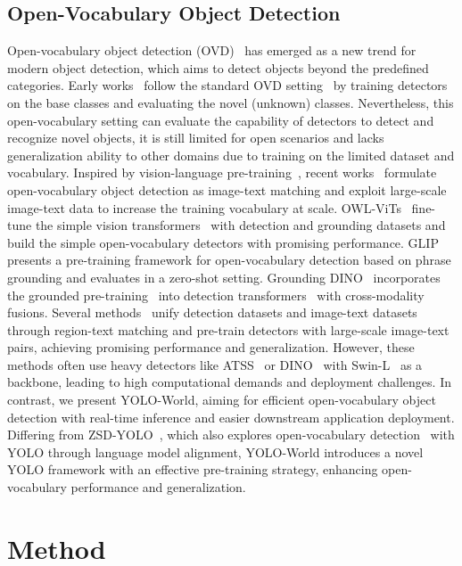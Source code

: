 \documentclass[10pt,twocolumn,letterpaper]{article}
\newcommand{\name}{YOLO-World}
\begin{document}
\subsection{Open-Vocabulary Object Detection}
Open-vocabulary object detection (OVD)~\cite{OVD} has emerged as a new trend for modern object detection, which aims to detect objects beyond the predefined categories. Early works~\cite{ViLD} follow the standard OVD setting~\cite{OVD} by training detectors on the base classes and evaluating the novel (unknown) classes. Nevertheless, this open-vocabulary setting can evaluate the capability of detectors to detect and recognize novel objects, it is still limited for open scenarios and lacks generalization ability to other domains due to training on the limited dataset and vocabulary. Inspired by vision-language pre-training~\cite{CLIP,ALIGN}, recent works~\cite{RegionCLIP,Detic,FVLM,DetPro,BARON} formulate open-vocabulary object detection as image-text matching and exploit large-scale image-text data to increase the training vocabulary at scale.
OWL-ViTs~\cite{owlv1,owlv2} fine-tune the simple vision transformers~\cite{ViT} with detection and grounding datasets and build the simple open-vocabulary detectors with promising performance.
GLIP~\cite{GLIP} presents a pre-training framework for open-vocabulary detection based on phrase grounding and evaluates in a zero-shot setting. Grounding DINO~\cite{GroundingDINO} incorporates the grounded pre-training~\cite{GLIP} into detection transformers~\cite{DINO} with cross-modality fusions.
Several methods~\cite{GLIPv2,VLDet,DetCLIP,DetCLIPv2} unify detection datasets and image-text datasets through region-text matching and pre-train detectors with large-scale image-text pairs, achieving promising performance and generalization. However, these methods often use heavy detectors like ATSS~\cite{ATSS} or DINO~\cite{DINO} with Swin-L~\cite{SwinTransformer} as a backbone, leading to high computational demands and deployment challenges. In contrast, we present \name{}, aiming for efficient open-vocabulary object detection with real-time inference and easier downstream application deployment. Differing from ZSD-YOLO~\cite{ZSD_YOLO}, which also explores open-vocabulary detection~\cite{OVD} with YOLO through language model alignment, \name{} introduces a novel YOLO framework with an effective pre-training strategy, enhancing open-vocabulary performance and generalization.

\section{Method}
\end{document}
